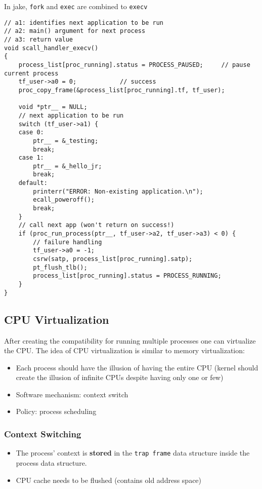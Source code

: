 In jake, \texttt{fork} and \texttt{exec} are combined to \texttt{execv}
\begin{lstlisting}[style=bright_C++]
// a1: identifies next application to be run
// a2: main() argument for next process
// a3: return value
void scall_handler_execv()
{
    process_list[proc_running].status = PROCESS_PAUSED;     // pause current process
    tf_user->a0 = 0;            // success                                    
    proc_copy_frame(&process_list[proc_running].tf, tf_user);

    void *ptr__ = NULL;
    // next application to be run
    switch (tf_user->a1) {
    case 0:
        ptr__ = &_testing;
        break;
    case 1:
        ptr__ = &_hello_jr;
        break;
    default:
        printerr("ERROR: Non-existing application.\n");
        ecall_poweroff();
        break;
    }
    // call next app (won't return on success!)
    if (proc_run_process(ptr__, tf_user->a2, tf_user->a3) < 0) {
        // failure handling
        tf_user->a0 = -1;
        csrw(satp, process_list[proc_running].satp);
        pt_flush_tlb();
        process_list[proc_running].status = PROCESS_RUNNING;
    }
}
\end{lstlisting}

\subsection{CPU Virtualization}
After creating the compatibility for running multiple processes one can virtualize the CPU. The idea of CPU virtualization is similar to memory virtualization:
\begin{itemize}
    \item Each process should have the illusion of having the entire CPU (kernel should create the illusion of infinite CPUs despite having only one or few)
    \item Software mechanism: context switch
    \item Policy: process scheduling
\end{itemize}
\subsubsection{Context Switching}
\begin{itemize}
    \item The process' context is \textbf{stored} in the \texttt{trap frame} data structure inside the process data structure.
    \item CPU cache needs to be flushed (contains old address space)
\end{itemize}

